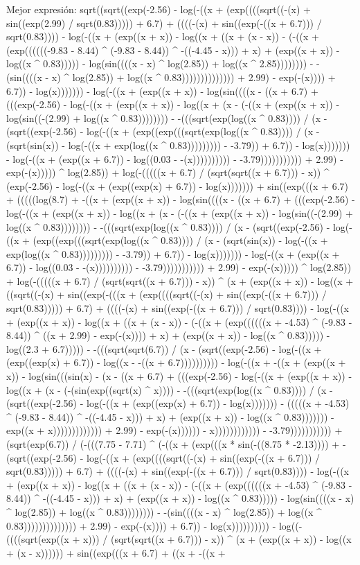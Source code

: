 Mejor expresión: sqrt((sqrt((exp(-2.56) - log(-((x + (exp((((sqrt((-(x) + sin((exp(2.99) / sqrt(0.83))))) + 6.7) + ((((-(x) + sin((exp(-((x + 6.7))) / sqrt(0.83)))) - log(-((x + (exp((x + x)) - log((x + ((x + (x - x)) - (-((x + (exp((((((-9.83 - 8.44) ^ (-9.83 - 8.44)) ^ -((-4.45 - x))) + x) + (exp((x + x)) - log((x ^ 0.83))))) - log(sin((((x - x) ^ log(2.85)) + log((x ^ 2.85)))))))) - -(sin((((x - x) ^ log(2.85)) + log((x ^ 0.83)))))))))))))) + 2.99) - exp(-(x)))) + 6.7)) - log(x))))))) - log(-((x + (exp((x + x)) - log(sin((((x - ((x + 6.7) + (((exp(-2.56) - log(-((x + (exp((x + x)) - log((x + (x - (-((x + (exp((x + x)) - log(sin((-(2.99) + log((x ^ 0.83)))))))) - -(((sqrt(exp(log((x ^ 0.83)))) / (x - (sqrt((exp(-2.56) - log(-((x + (exp((exp(((sqrt(exp(log((x ^ 0.83)))) / (x - (sqrt(sin(x)) - log(-((x + exp(log((x ^ 0.83))))))))) - -3.79)) + 6.7)) - log(x))))))) - log(-((x + (exp((x + 6.7)) - log((0.03 - -(x)))))))))) - -3.79))))))))))) + 2.99) - exp(-(x))))) ^ log(2.85)) + log(-(((((x + 6.7) / (sqrt(sqrt((x + 6.7))) - x)) ^ (exp(-2.56) - log(-((x + (exp((exp(x) + 6.7)) - log(x))))))) + sin((exp(((x + 6.7) + (((((log(8.7) + -((x + (exp((x + x)) - log(sin((((x - ((x + 6.7) + (((exp(-2.56) - log(-((x + (exp((x + x)) - log((x + (x - (-((x + (exp((x + x)) - log(sin((-(2.99) + log((x ^ 0.83)))))))) - -(((sqrt(exp(log((x ^ 0.83)))) / (x - (sqrt((exp(-2.56) - log(-((x + (exp((exp(((sqrt(exp(log((x ^ 0.83)))) / (x - (sqrt(sin(x)) - log(-((x + exp(log((x ^ 0.83))))))))) - -3.79)) + 6.7)) - log(x))))))) - log(-((x + (exp((x + 6.7)) - log((0.03 - -(x)))))))))) - -3.79))))))))))) + 2.99) - exp(-(x))))) ^ log(2.85)) + log(-(((((x + 6.7) / (sqrt(sqrt((x + 6.7))) - x)) ^ (x + (exp((x + x)) - log((x + ((sqrt((-(x) + sin((exp(-(((x + (exp((((sqrt((-(x) + sin((exp(-((x + 6.7))) / sqrt(0.83))))) + 6.7) + ((((-(x) + sin((exp(-((x + 6.7))) / sqrt(0.83)))) - log(-((x + (exp((x + x)) - log((x + ((x + (x - x)) - (-((x + (exp((((((x + -4.53) ^ (-9.83 - 8.44)) ^ ((x + 2.99) - exp(-(x)))) + x) + (exp((x + x)) - log((x ^ 0.83))))) - log((2.3 + 6.7))))) - -(((sqrt(sqrt(6.7)) / (x - (sqrt((exp(-2.56) - log(-((x + (exp((exp(x) + 6.7)) - log((x - -((x + 6.7)))))))))) - log(-((x + -((x + (exp((x + x)) - log(sin(((sin(x) - (x - ((x + 6.7) + (((exp(-2.56) - log(-((x + (exp((x + x)) - log((x + (x - (-(sin(exp((sqrt(x) ^ x)))) - -(((sqrt(exp(log((x ^ 0.83)))) / (x - (sqrt((exp(-2.56) - log(-((x + (exp((exp(x) + 6.7)) - log(x))))))) - (((((x + -4.53) ^ (-9.83 - 8.44)) ^ -((-4.45 - x))) + x) + (exp((x + x)) - log((x ^ 0.83))))))) - exp((x + x))))))))))))) + 2.99) - exp(-(x)))))) - x)))))))))))) - -3.79))))))))))) + (sqrt(exp(6.7)) / (-(((7.75 - 7.71) ^ (-((x + (exp(((x * sin(-((8.75 * -2.13)))) + -(sqrt((exp(-2.56) - log(-((x + (exp((((sqrt((-(x) + sin((exp(-((x + 6.7))) / sqrt(0.83))))) + 6.7) + ((((-(x) + sin((exp(-((x + 6.7))) / sqrt(0.83)))) - log(-((x + (exp((x + x)) - log((x + ((x + (x - x)) - (-((x + (exp((((((x + -4.53) ^ (-9.83 - 8.44)) ^ -((-4.45 - x))) + x) + (exp((x + x)) - log((x ^ 0.83))))) - log(sin((((x - x) ^ log(2.85)) + log((x ^ 0.83)))))))) - -(sin((((x - x) ^ log(2.85)) + log((x ^ 0.83)))))))))))))) + 2.99) - exp(-(x)))) + 6.7)) - log(x)))))))))) - log((-((((sqrt(exp((x + x))) / (sqrt(sqrt((x + 6.7))) - x)) ^ (x + (exp((x + x)) - log((x + (x - x)))))) + sin((exp(((x + 6.7) + ((x + -((x + 